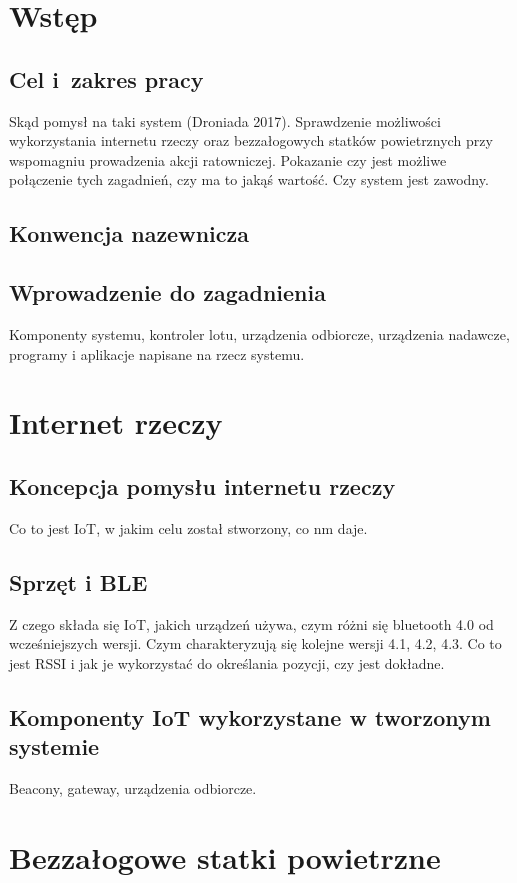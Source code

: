 \section{Wstęp}
\suppressfloats[t]  %
\subsection{Cel i~zakres pracy}
Skąd pomysł na taki system (Droniada 2017). Sprawdzenie możliwości wykorzystania internetu rzeczy oraz bezzałogowych statków powietrznych przy wspomagniu prowadzenia akcji ratowniczej. Pokazanie czy jest możliwe połączenie tych zagadnień, czy ma to jakąś wartość. Czy system jest zawodny.
\subsection{Konwencja nazewnicza}
\subsection{Wprowadzenie do zagadnienia}
Komponenty systemu, kontroler lotu, urządzenia odbiorcze, urządzenia nadawcze, programy i aplikacje napisane na rzecz systemu.

\section{Internet rzeczy}
\subsection{Koncepcja pomysłu internetu rzeczy}
Co to jest IoT, w jakim celu został stworzony, co nm daje.
\subsection{Sprzęt i BLE}
Z czego składa się IoT, jakich urządzeń używa, czym różni się bluetooth 4.0 od wcześniejszych wersji. Czym charakteryzują się kolejne wersji 4.1, 4.2, 4.3. Co to jest RSSI i jak je wykorzystać do określania pozycji, czy jest dokładne.
\subsection{Komponenty IoT wykorzystane w tworzonym systemie}
Beacony, gateway, urządzenia odbiorcze.

\section{Bezzałogowe statki powietrzne}
